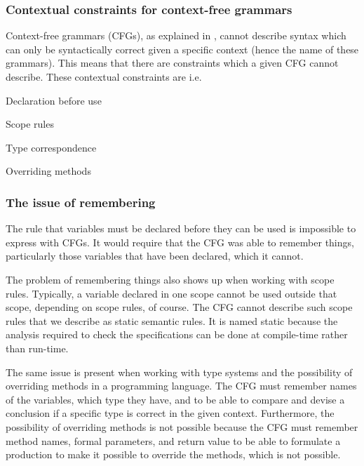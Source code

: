 \subsubsection{Contextual constraints for context-free grammars}
\label{sec:contextualconstraints}

Context-free grammars (CFGs), as explained in , cannot describe syntax which can only be
syntactically correct given a specific context (hence the name of these
grammars). This means that there are constraints which a given CFG cannot
describe.
These contextual constraints are i.e.\:
\cite[p. 39]{plpp}

\begin{dlist}
\item Declaration before use
\item Scope rules
\item Type correspondence
\item Overriding methods
\end{dlist}


\subsubsection*{The issue of remembering}

The rule that variables must be declared before they can be used is impossible
to express with CFGs. It would require that the CFG was able to remember things,
particularly those variables that have been declared, which it cannot. 

The problem of remembering things also shows up when working with
scope rules. Typically, a variable declared in one scope cannot be
used outside that scope, depending on scope rules, of course. The CFG
cannot describe such scope rules that we describe as static semantic
rules. It is named static because the analysis required to check the
specifications can be done at compile-time rather than run-time.
\cite[p. 153]{sebesta2013}

The same issue is present when working with type systems and the
possibility of overriding methods in a programming language. The CFG
must remember names of the variables, which type they have, and to be
able to compare and devise a conclusion if a specific type is correct in
the given context. Furthermore, the possibility of overriding methods
is not possible because the CFG must remember method names, formal
parameters, and return value to be able to formulate a production to
make it possible to override the methods, which is not possible.

